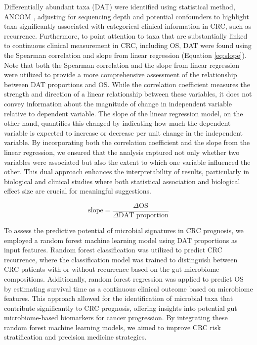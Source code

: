 \documentclass[11pt, a4paper, onecolumn, oneside]{report}
\begin{document}
                Differentially abundant taxa (DAT) were identified using statistical method, ANCOM \cite{ANCOM-1}, adjusting for sequencing depth and potential confounders to highlight taxa significantly associated with categorical clinical information in CRC, such as recurrence. Furthermore, to point attention to taxa that are substantially linked to continuous clinical measurement in CRC, including OS, DAT were found using the Spearman correlation and slope from linear regression (Equation \ref{eq:slope}). Note that both the Spearman correlation and the slope from linear regression were utilized to provide a more comprehensive assessment of the relationship between DAT proportions and OS. While the correlation coefficient measures the strength and direction of a linear relationship between these variables, it does not convey information about the magnitude of change in independent variable relative to dependent variable. The slope of the linear regression model, on the other hand, quantifies this changed by indicating how much the dependent variable is expected to increase or decrease per unit change in the independent variable. By incorporating both the correlation coefficient and the slope from the linear regression, we ensured that the analysis captured not only whether two variables were associated but also the extent to which one variable influenced the other. This dual approach enhances the interpretability of results, particularly in biological and clinical studies where both statistical association and biological effect size are crucial for meaningful suggestions.

                \begin{equation}
                    \textrm{slope} = \frac{\Delta \textrm{OS}}{\Delta \textrm{DAT proportion}}
                    \label{eq:slope}
                \end{equation}

                To assess the predictive potential of microbial signatures in CRC prognosis, we employed a random forest machine learning model using DAT proportions as input features. Random forest classification was utilized to predict CRC recurrence, where the classification model was trained to distinguish between CRC patients with or without recurrence based on the gut microbiome compositions. Additionally, random forest regression was applied to predict OS by estimating survival time as a continuous clinical outcome based on microbiome features. This approach allowed for the identification of microbial taxa that contribute significantly to CRC prognosis, offering insights into potential gut microbiome-based biomarkers for cancer progression. By integrating these random forest machine learning models, we aimed to improve CRC risk stratification and precision medicine strategies.
\end{document}
